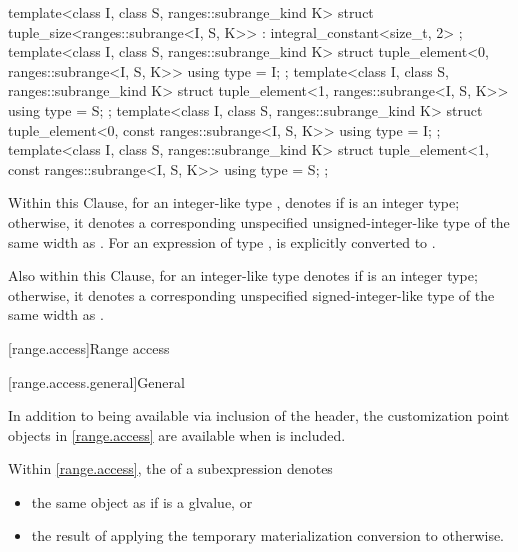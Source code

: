 \begin{codeblock}
{  template<class I, class S, ranges::subrange_kind K>
  struct tuple_size<ranges::subrange<I, S, K>>
    : integral_constant<size_t, 2> {};
  template<class I, class S, ranges::subrange_kind K>
  struct tuple_element<0, ranges::subrange<I, S, K>> {
    using type = I;
  };
  template<class I, class S, ranges::subrange_kind K>
  struct tuple_element<1, ranges::subrange<I, S, K>> {
    using type = S;
  };
  template<class I, class S, ranges::subrange_kind K>
  struct tuple_element<0, const ranges::subrange<I, S, K>> {
    using type = I;
  };
  template<class I, class S, ranges::subrange_kind K>
  struct tuple_element<1, const ranges::subrange<I, S, K>> {
    using type = S;
  };
}
\end{codeblock}

\pnum
{}%
%
Within this Clause,
for an integer-like type ,
 denotes
 if  is an integer type;
otherwise, it denotes a corresponding unspecified unsigned-integer-like type
of the same width as .
For an expression  of type ,
 is
 explicitly converted to
.

\pnum
Also within this Clause,
 for an integer-like type 
denotes  if  is an integer type;
otherwise, it denotes a corresponding unspecified signed-integer-like type
of the same width as .

[range.access]{Range access}

[range.access.general]{General}

\pnum
In addition to being available via inclusion of the 
header, the customization point objects in \ref{range.access} are
available when  is included.

\pnum
Within \ref{range.access},
the  of a subexpression  denotes
\begin{itemize}
\item
the same object as  if  is a glvalue, or
\item
the result of applying
the temporary materialization conversion to  otherwise.
\end{itemize}

